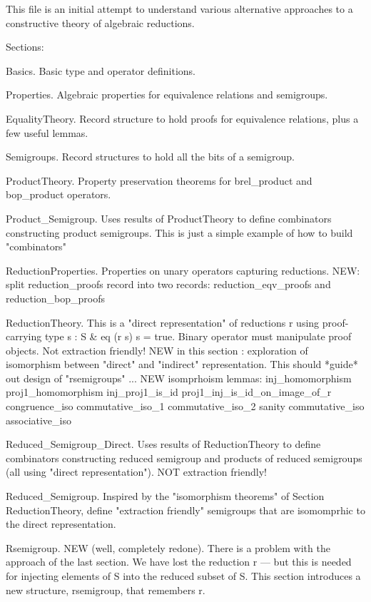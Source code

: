 This file is an initial attempt to 
   understand various alternative 
   approaches to a constructive theory 
   of algebraic reductions.

   Sections: 

   Basics. Basic type and operator definitions. 

   Properties. Algebraic properties for equivalence 
      relations and semigroups. 

   EqualityTheory. Record structure to hold proofs for 
      equivalence relations, plus a few useful lemmas. 

   Semigroups. Record structures to hold all the bits of a semigroup. 

   ProductTheory. Property preservation theorems for 
      brel_product and bop_product operators. 

   Product_Semigroup. Uses results of ProductTheory to define 
      combinators constructing product semigroups. 
      This is just a simple example of how to build "combinators"

   ReductionProperties. Properties on unary operators capturing reductions. 
      NEW: split reduction_proofs record into two records: reduction_eqv_proofs and reduction_bop_proofs

   ReductionTheory. This is a "direct representation" of 
      reductions r using proof-carrying type {s : S & eq (r s) s = true}. 
      Binary operator must manipulate proof objects. 
      Not extraction friendly! 
      NEW in this section : exploration of isomorphism between "direct" and "indirect" representation. 
          This should *guide* out design of "rsemigroups" ... 
      NEW isomprhoism lemmas: 
          inj_homomorphism
          proj1_homomorphism
          inj_proj1_is_id
          proj1_inj_is_id_on_image_of_r
          congruence_iso 
          commutative_iso_1
          commutative_iso_2
          sanity 
          commutative_iso
          associative_iso

   Reduced_Semigroup_Direct. Uses results of ReductionTheory to define 
      combinators constructing reduced semigroup and products 
      of reduced semigroups (all using "direct representation"). 
      NOT extraction friendly! 

   Reduced_Semigroup. Inspired by the "isomorphism theorems" of 
      Section ReductionTheory, define "extraction friendly" 
      semigroups that are isomomprhic to the direct representation. 

   Rsemigroup. NEW (well, completely redone). 
       There is a problem with the approach of the last section. 
       We have lost the reduction r --- but this is needed for 
       injecting elements of S into the reduced subset of S. 
       This section introduces a new structure, rsemigroup, that 
       remembers r. 

